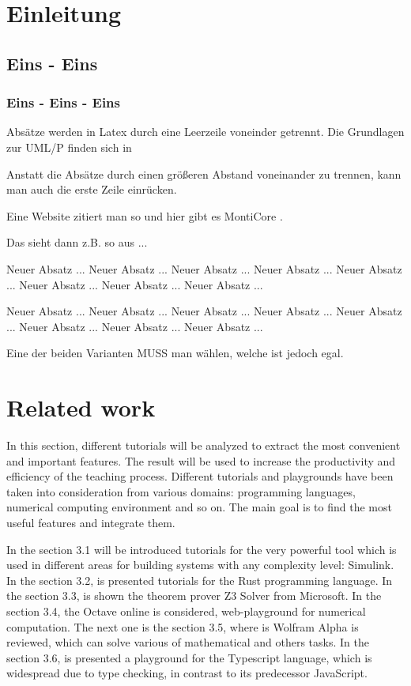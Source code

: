 \chapter{Einleitung}
\section{Eins - Eins}
\subsection{Eins - Eins - Eins}


Absätze werden in Latex durch eine Leerzeile voneinder getrennt. Die Grundlagen zur UML/P finden sich in \cite{Rum11}

Anstatt die Absätze durch einen größeren Abstand voneinander zu trennen, kann man auch die erste Zeile einrücken.

Eine Website zitiert man so \cite{SE10} und hier gibt es MontiCore \cite{Mon10}. 

Das sieht dann z.B. so aus ...
\setlength{\parindent}{3ex}
\setlength{\parskip}{0ex}

Neuer Absatz ... Neuer Absatz ... Neuer Absatz ... Neuer Absatz ... Neuer Absatz ... Neuer Absatz ... Neuer Absatz ... Neuer Absatz ...

Neuer Absatz ... Neuer Absatz ... Neuer Absatz ... Neuer Absatz ... Neuer Absatz ... Neuer Absatz ... Neuer Absatz ... Neuer Absatz ...

Eine der beiden Varianten MUSS man wählen, welche ist jedoch egal.

\cleardoublepage

\chapter{Related work}
In this section, different tutorials will be analyzed to extract the most convenient and important features. The result will be used to increase the productivity and efficiency of the teaching process. Different tutorials and playgrounds have been taken into consideration from various domains: programming languages, numerical computing environment and so on. The main goal is to find the most useful features and integrate them.

In the section 3.1 will be introduced tutorials for the very powerful tool which is used in different areas for building systems with any complexity level: Simulink. In the section 3.2, is presented tutorials for the Rust programming language. In the section 3.3, is shown the theorem prover Z3 Solver from Microsoft. In the section 3.4, the Octave online is considered, web-playground for numerical computation. The next one is the section 3.5, where is Wolfram Alpha is reviewed, which can solve various of mathematical and others tasks. In the section 3.6, is presented a playground for the Typescript language, which is widespread due to type checking, in contrast to its predecessor JavaScript.

